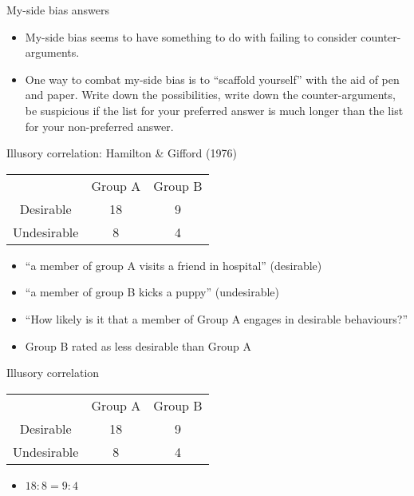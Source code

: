 \documentclass{beamer}
\begin{document}
\begin{frame}{My-side bias answers}
\begin{itemize}
\item My-side bias seems to have something to do with failing to consider counter-arguments.
\item One way to combat my-side bias is to ``scaffold yourself'' with the aid of pen and paper. Write down the possibilities, write down the counter-arguments, be suspicious if the list for your preferred answer is much longer than the list for your non-preferred answer.
\end{itemize}
\end{frame}



\begin{frame}{Illusory correlation: Hamilton \& Gifford (1976)}
\begin{tabular} {c c c}
			&	Group A	 &	Group B \\
Desirable	&	18	&		9 \\
Undesirable	&	8	&		4 \\
\end{tabular} 
\vspace{12 pt}
\begin{itemize} 
\item ``a member of group A visits a friend in hospital'' (desirable)
\item ``a member of group B kicks a puppy'' (undesirable) 
\vspace{12 pt}
\item ``How likely is it that a member of Group A engages in desirable behaviours?'' 
\vspace{12 pt}
\item Group B rated as less desirable than Group A 
\end{itemize}
\end{frame}

\begin{frame}{Illusory correlation}
\begin{tabular} {c c c}
			&	Group A	 &	Group B \\
Desirable	&	18	&		9 \\
Undesirable	&	8	&		4 \\
\end{tabular} 
\vspace{12 pt}
\begin{itemize}
\item $18:8 = 9:4$
\end{itemize}
\end{frame}
\end{document}
